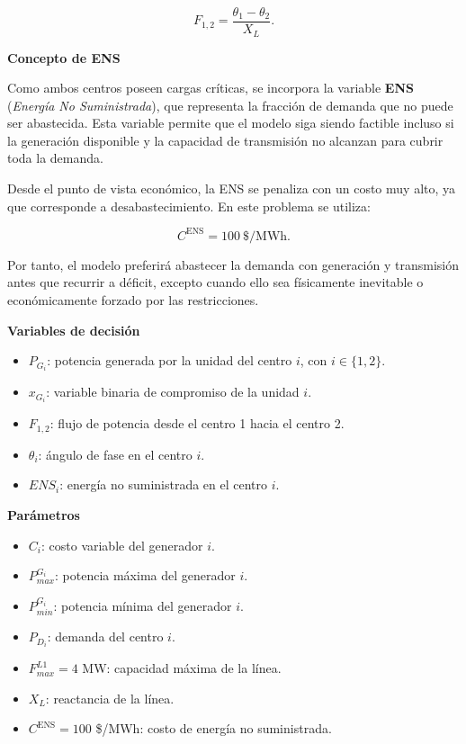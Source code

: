 \begin{enumerate}
\begin{equation}
    F_{1,2} = \frac{\theta_1-\theta_2}{X_L}.
    \label{ex:2:3:eq:flujos-dc}
\end{equation}

\textbf{Concepto de ENS}

Como ambos centros poseen cargas críticas, se incorpora la variable \textbf{ENS} (\emph{Energía No Suministrada}), que representa la fracción de demanda que no puede ser abastecida. Esta variable permite que el modelo siga siendo factible incluso si la generación disponible y la capacidad de transmisión no alcanzan para cubrir toda la demanda.

Desde el punto de vista económico, la ENS se penaliza con un costo muy alto, ya que corresponde a desabastecimiento. En este problema se utiliza:

\begin{equation}
    C^{\text{ENS}} = 100 \ \$/\text{MWh}.
\end{equation}

Por tanto, el modelo preferirá abastecer la demanda con generación y transmisión antes que recurrir a déficit, excepto cuando ello sea físicamente inevitable o económicamente forzado por las restricciones.

\textbf{Variables de decisión}

\begin{itemize}
    \item $P_{G_i}$: potencia generada por la unidad del centro $i$, con $i\in\{1,2\}$.
    \item $x_{G_i}$: variable binaria de compromiso de la unidad $i$.
    \item $F_{1,2}$: flujo de potencia desde el centro 1 hacia el centro 2.
    \item $\theta_i$: ángulo de fase en el centro $i$.
    \item $ENS_i$: energía no suministrada en el centro $i$.
\end{itemize}

\textbf{Parámetros}

\begin{itemize}
    \item $C_i$: costo variable del generador $i$.
    \item $P_{max}^{G_i}$: potencia máxima del generador $i$.
    \item $P_{min}^{G_i}$: potencia mínima del generador $i$.
    \item $P_{D_i}$: demanda del centro $i$.
    \item $F_{max}^{L1}=4$ MW: capacidad máxima de la línea.
    \item $X_L$: reactancia de la línea.
    \item $C^{\text{ENS}}=100$ \$/MWh: costo de energía no suministrada.
\end{itemize}


\end{enumerate}

